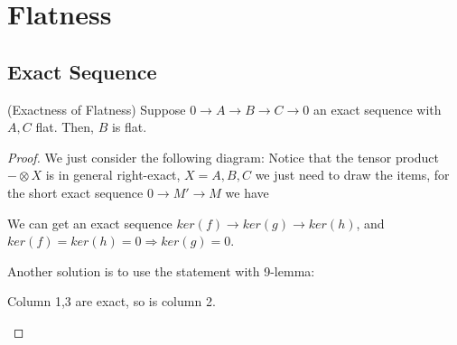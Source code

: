 \documentclass[Total.tex]{subfiles}
\begin{document}
		\section{Flatness}
			\subsection{Exact Sequence}
				
				\begin{proposition}
					(Exactness of Flatness) Suppose $0\rightarrow A\rightarrow B\rightarrow C\rightarrow 0$ an exact sequence with $A,C$ flat. Then, $B$ is flat.
				\end{proposition}
				\begin{proof}
					We just consider the following diagram: Notice that the tensor product $-\otimes X$ is in general right-exact, $X=A,B,C$ we just need to draw the items, for the short exact sequence $0\rightarrow M'\rightarrow M$ we have
					\begin{center}
					\end{center}
					
					We can get an exact sequence $ker(f)\rightarrow ker(g)\rightarrow ker(h)$, and $ker(f)=ker(h)=0\Rightarrow ker(g)=0$.
					
					Another solution is to use the statement with 9-lemma:
					\begin{center}
						
						Column 1,3 are exact, so is column 2.
					\end{center}
				\end{proof}
\end{document}
